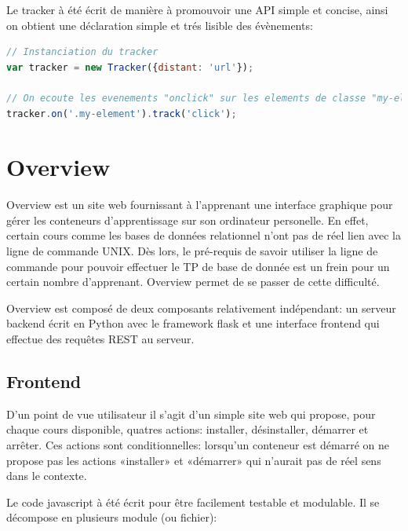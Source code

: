 \documentclass[a4paper,11pt]{report}
\begin{document}
Le tracker à été écrit de manière à promouvoir une API simple et concise, ainsi on obtient une déclaration simple et trés lisible des évènements:

\begin{lstlisting}[language=javascript, caption={Exemple d'utilisation de tracker.js}]
// Instanciation du tracker
var tracker = new Tracker({distant: 'url'});

// On ecoute les evenements "onclick" sur les elements de classe "my-element"
tracker.on('.my-element').track('click');
\end{lstlisting}

\section{Overview}

Overview est un site web fournissant à l'apprenant une interface graphique pour gérer les conteneurs d'apprentissage sur son ordinateur personelle.
En effet, certain cours comme les bases de données relationnel n'ont pas de réel lien avec la ligne de commande UNIX. Dès lors, le pré-requis de savoir utiliser la ligne de commande pour pouvoir effectuer le TP de base de donnée est un frein pour un certain nombre d'apprenant. Overview permet de se passer de cette difficulté.

Overview est composé de deux composants relativement indépendant: un serveur backend écrit en Python avec le framework flask et une interface frontend qui effectue des requêtes REST au serveur.

\subsection{Frontend}

D'un point de vue utilisateur il s'agit d'un simple site web qui propose, pour chaque cours disponible, quatres actions: installer, désinstaller, démarrer et arrêter. Ces actions sont conditionnelles: lorsqu'un conteneur est démarré on ne propose pas les actions «installer» et «démarrer» qui n'aurait pas de réel sens dans le contexte.

Le code javascript à été écrit pour être facilement testable et modulable. Il se décompose en plusieurs module (ou fichier):
\end{document}
